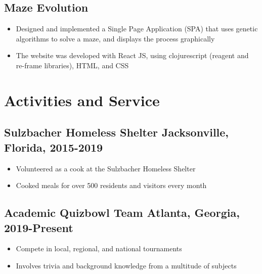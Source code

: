 \documentclass[12pt, noindent]{article}
\begin{document}
\subsection{Maze Evolution}
\begin{itemize}
  \itemsep-.25em
\item Designed and implemented a Single Page Application (SPA) that uses genetic
  algorithms to solve a maze, and displays the process graphically
\item The website was developed with React JS, using clojurescript (reagent and
  re-frame libraries), HTML, and CSS
\end{itemize}

\section{Activities and Service}
\subsection{Sulzbacher Homeless Shelter \hfill \normalsize \normalfont
  Jacksonville, Florida, 2015-2019}
\begin{itemize}
  \itemsep-.25em
\item Volunteered as a cook at the Sulzbacher Homeless Shelter
\item Cooked meals for over 500 residents and visitors every month
\end{itemize}
\subsection{Academic Quizbowl Team \hfill \normalsize \normalfont Atlanta,
  Georgia, 2019-Present}
\begin{itemize}
  \itemsep-.25em
\item Compete in local, regional, and national tournaments
\item Involves trivia and background knowledge from a multitude of subjects
\end{itemize}
\end{document}

